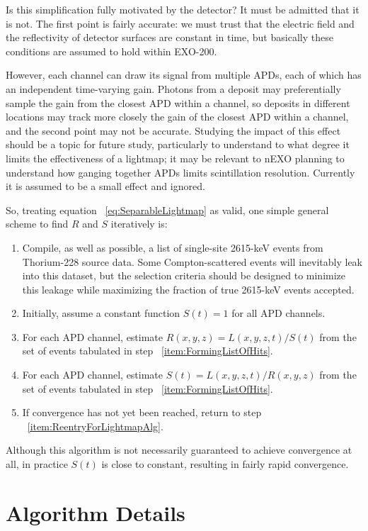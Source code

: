 Is this simplification fully motivated by the detector?  It must be admitted that it is not.  The first point is fairly accurate:  we must trust that the electric field and the reflectivity of detector surfaces are constant in time, but basically these conditions are assumed to hold within EXO-200.

However, each channel can draw its signal from multiple APDs, each of which has an independent time-varying gain.  Photons from a deposit may preferentially sample the gain from the closest APD within a channel, so deposits in different locations may track more closely the gain of the closest APD within a channel, and the second point may not be accurate.  Studying the impact of this effect should be a topic for future study, particularly to understand to what degree it limits the effectiveness of a lightmap; it may be relevant to nEXO planning to understand how ganging together APDs limits scintillation resolution.  Currently it is assumed to be a small effect and ignored.

So, treating equation ~\ref{eq:SeparableLightmap} as valid, one simple general scheme to find $R$ and $S$ iteratively is:
\begin{enumerate}
\item \label{item:FormingListOfHits} Compile, as well as possible, a list of single-site 2615-keV events from Thorium-228 source data.  Some Compton-scattered events will inevitably leak into this dataset, but the selection criteria should be designed to minimize this leakage while maximizing the fraction of true 2615-keV events accepted.
\item Initially, assume a constant function $S(t) = 1$ for all APD channels.
\item \label{item:ReentryForLightmapAlg} For each APD channel, estimate $R(x,y,z) = L(x,y,z,t)/S(t)$ from the set of events tabulated in step ~\ref{item:FormingListOfHits}.
\item For each APD channel, estimate $S(t) = L(x,y,z,t)/R(x,y,z)$ from the set of events tabulated in step ~\ref{item:FormingListOfHits}.
\item If convergence has not yet been reached, return to step ~\ref{item:ReentryForLightmapAlg}.
\end{enumerate}
Although this algorithm is not necessarily guaranteed to achieve convergence at all, in practice $S(t)$ is close to constant, resulting in fairly rapid convergence.

\section{Algorithm Details}

